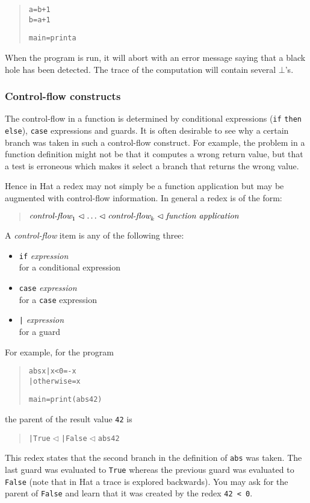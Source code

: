 \documentclass[12pt]{article}
\newenvironment{code}{\begin{quote}\begin{alltt}}{\end{alltt}\end{quote}}
\newcommand{\within}{\vartriangleleft}
\begin{document}
\begin{code}
a = b + 1
b = a + 1

main = print a
\end{code}

When the program is run, it will abort with an error message saying that a black hole has been detected. The trace of the computation will contain several $\bot$'s.


\subsubsection{Control-flow constructs}

The control-flow in a function is determined by conditional expressions (\texttt{if} \texttt{then} \texttt{else}), \texttt{case} expressions and guards. 
It is often desirable to see why a certain branch was taken in such a control-flow construct. For example, the problem in a function definition might not be that it computes a wrong return value, but that a test is erroneous which makes it select a branch that returns the wrong value. 

Hence in Hat a redex may not simply be a function application but may be augmented with control-flow information. In general a redex is of the form:
\begin{quote}
$\emph{control-flow}_1 \within \ldots \within \emph{control-flow}_k 
\within \emph{function application}$
\end{quote}
A \emph{control-flow} item is any of the following three:
\begin{itemize}
\item \texttt{if} \emph{expression}\\
for a conditional expression
\item \texttt{case} \emph{expression}\\
for a \texttt{case} expression
\item \texttt{|} \emph{expression}\\
for a guard
\end{itemize}
%
For example, for the program
\begin{code} 
abs x | x < 0 = -x
      | otherwise = x 

main = print (abs 42)
\end{code}
the parent of the result value \texttt{42} is
\begin{code}
| True \(\within\) | False \(\within\) abs 42
\end{code}
This redex states that the second branch in the definition of \texttt{abs} was taken. The last guard was evaluated to \texttt{True} whereas the previous guard was evaluated to \texttt{False} (note that in Hat a trace is explored backwards). You may ask for the parent of \texttt{False} and learn that it was created by the redex \texttt{42 < 0}.
\end{document}
